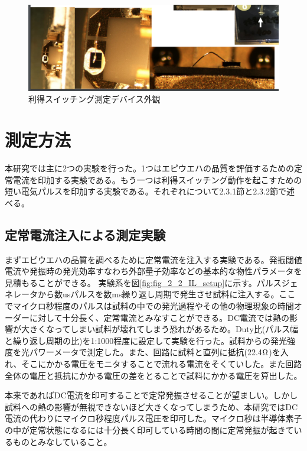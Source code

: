 \begin{figure}[h]
	\centering
	\includegraphics[width=15cm]{figure/fig_2_1_mount.png}
	\caption{利得スイッチング測定デバイス外観}
	\label{fig:fig_2_1_mount_GS}
\end{figure}
\clearpage
\section{測定方法}%
本研究では主に2つの実験を行った。1つはエピウエハの品質を評価するための定常電流を印加する実験である。もう一つは利得スイッチング動作を起こすための短い電気パルスを印加する実験である。それぞれについて2.3.1節と2.3.2節で述べる。
\subsection{定常電流注入による測定実験}%
まずエピウエハの品質を調べるために定常電流を注入する実験である。発振閾値電流や発振時の発光効率すなわち外部量子効率などの基本的な物性パラメータを見積もることができる。
実験系を図\ref{fig:fig_2_2_IL_setup}に示す。パルスジェネレータから数usパルスを数ms繰り返し周期で発生させ試料に注入する。ここでマイクロ秒程度のパルスは試料の中での発光過程やその他の物理現象の時間オーダーに対して十分長く、定常電流とみなすことができる。DC電流では熱の影響が大きくなってしまい試料が壊れてしまう恐れがあるため。Duty比(パルス幅と繰り返し周期の比)を1:1000程度に設定して実験を行った。試料からの発光強度を光パワーメータで測定した。また、回路に試料と直列に抵抗(22.4$\rm{\Omega}$)を入れ、そこにかかる電圧をモニタすることで流れる電流をそくていした。また回路全体の電圧と抵抗にかかる電圧の差をとることで試料にかかる電圧を算出した。

本来であればDC電流を印可することで定常発振させることが望ましい。しかし試料への熱の影響が無視できないほど大きくなってしまうため、本研究ではDC電流の代わりにマイクロ秒程度パルス電圧を印可した。マイクロ秒は半導体素子の中が定常状態になるには十分長く印可している時間の間に定常発振が起きているものとみなしていること。

